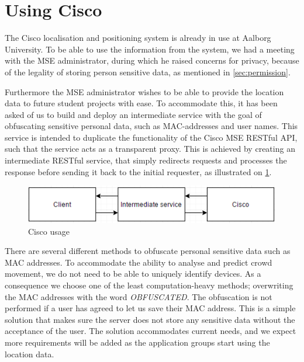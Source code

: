 \section{Using Cisco}\label{sec:cisco_usage}
The Cisco localisation and positioning system is already in use at Aalborg University. To be able to use the information from the system, we had a meeting with the MSE administrator, during which he raised concerns for privacy, because of the legality of storing person sensitive data, as mentioned in \cref{sec:permission}. 

Furthermore the MSE administrator wishes to be able to provide the location data to future student projects with ease. To accommodate this, it has been asked of us to build and deploy an intermediate service with the goal of obfuscating sensitive personal data, such as MAC-addresses and user names. This service is intended to duplicate the functionality of the Cisco MSE RESTful API, such that the service acts as a transparent proxy. This is achieved by creating an intermediate RESTful service, that simply redirects requests and processes the response before sending it back to the initial requester, as illustrated on \cref{fig:cisco_usage}.

\begin{figure}[ht]
	\begin{center}
	\includegraphics[scale=0.9]{graphics/cisco_usage.png}
	\caption{Cisco usage}
	\label{fig:cisco_usage}
	\end{center} 
\end{figure}

There are several different methods to obfuscate personal sensitive data such as MAC addresses. To accommodate the ability to analyse and predict crowd movement, we do not need to be able to uniquely identify devices. As a consequence we choose one of the least computation-heavy methods; overwriting the MAC addresses with the word \emph{OBFUSCATED}. The obfuscation is not performed if a user has agreed to let us save their MAC address.
This is a simple solution that makes sure the server does not store any sensitive data without the acceptance of the user. The solution accommodates current needs, and we expect more requirements will be added as the application groups start using the location data.

